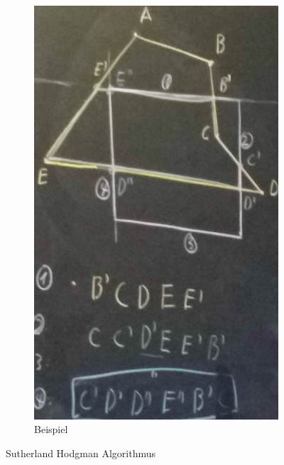 \begin{figure}[!ht]
\begin{subfigure}[b]{0.3\textwidth}
		\includegraphics[width=\textwidth]{fig/clipping}
		\caption{Beispiel}
	\end{subfigure}
	\label{fig:sutherland_hodgman}
	\caption{Sutherland Hodgman Algorithmus}
\end{figure}
